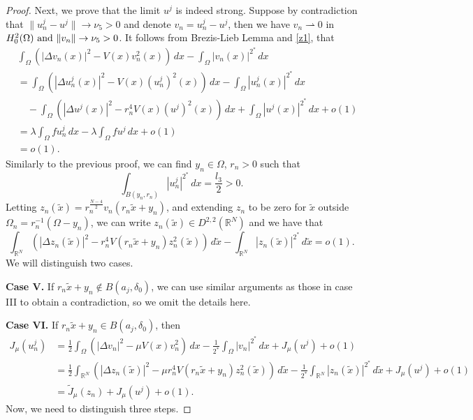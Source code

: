 \documentclass[10pt,a4paper]{amsart}
\numberwithin{equation}{section}
\begin{document}
\begin{proof}
Next, we prove that the limit \(u^j\) is indeed strong. Suppose by contradiction that 
\(\|u_n^j-u^j\|\to \nu_5> 0\) and denote \(v_n=u_n^j-u^j\), then we have 
\(v_n\rightharpoonup 0\) in \(H^2_0(\Omega)$ and $\|v_n\|\to \nu_5> 0\).
It follows from Brezis-Lieb Lemma and \eqref{z1}, that
 \begin{align*}
&\int_{\Omega}\left( |\Delta v_n(x)|^2- V(x)v_n^2(x)\right)\, dx
 -\int_{\Omega}|v_n(x)|^{2^*}\,dx\\
&=\int_{\Omega}\left( |\Delta u^j_n(x)|^2-V(x)(u^j_n)^2(x)\right) \,dx
 -\int _{\Omega}|u^j_n(x)|^{2^*}\,dx\\
& \quad - \int_{\Omega}\left( |\Delta u^j(x)|^2-r_n^4 V(x)(u^j)^2(x)\right) \,dx
 +\int _{\Omega}|u^j(x)|^{2^*}\,dx+o(1)\\
&=\lambda \int_{\Omega} fu_n^j\,dx-\lambda \int_{\Omega} fu^j\,dx+o(1)\\
&=o(1).
\end{align*}
Similarly to the previous proof, we can find \(y_n\in \Omega\), \(r_n>0\) such that 
\[
 \int _{B(y_n, r_n)}|u_n^j|^{2^*}\,dx=\frac{l_3}{2}>0.
 \]
Letting \(z_n(\tilde{x})=r_n^{\frac{N-4}{2}}v_n(r_n\tilde{x}+y_n)\), 
and extending \(z_n\) to be zero for \(\tilde{x}\) outside 
\(\Omega_n=r_n^{-1}(\Omega-y_n)\), we can write 
\(z_n(\tilde{x})\in D^{2,2}(\mathbb{R}^N)\) and we have that
\begin{equation}\label{z2}
 \int_{\mathbb{R}^N}\left( |\Delta z_n(\tilde{x})|^2-r_n^4 V(r_n\tilde{x}+y_n)z_n^2(\tilde{x})\right)\, d\tilde{x}-\int _{\mathbb{R}^N}|z_n(\tilde{x})|^{2^*}\,d\tilde{x}=o(1).
\end{equation}
We will distinguish two cases.
\smallskip

\noindent \textbf{Case V.} 
If \(r_n\tilde{x}+y_n \notin B(a_j, \delta_0)\), we can use similar arguments as 
those in case III to obtain a contradiction,
so we omit the details here.
\smallskip

\noindent\textbf{Case VI.} If \(r_n\tilde{x}+y_n \in B(a_j, \delta_0)\), then
 \begin{align*}
 J_{\mu}(u_n^j)
 &=\frac{1}{2}\int_{\Omega}(|\Delta v_n|^2-\mu V(x)v_n^2)\,dx-\frac{1}{2^*} \int_{\Omega} |v_n|^{2^*}\,dx+J_{\mu}(u^j)+o(1)\\
 &=\frac{1}{2}\int_{\mathbb{R}^N}\left( |\Delta z_n(\tilde{x})|^2
 -\mu r_n^4 V(r_n\tilde{x}+y_n)z_n^2(\tilde{x})\right)\,d\tilde{x}-\frac{1}{2^*}
 \int _{\mathbb{R}^N}|z_n(\tilde{x})|^{2^*}\,d\tilde{x}
  +J_{\mu}(u^j)+o(1)\\
 &=\tilde{J}_\mu(z_n)+J_{\mu}(u^j)+o(1).
 \end{align*}
 Now, we need to distinguish three steps.
\smallskip


\end{proof}
\end{document}

